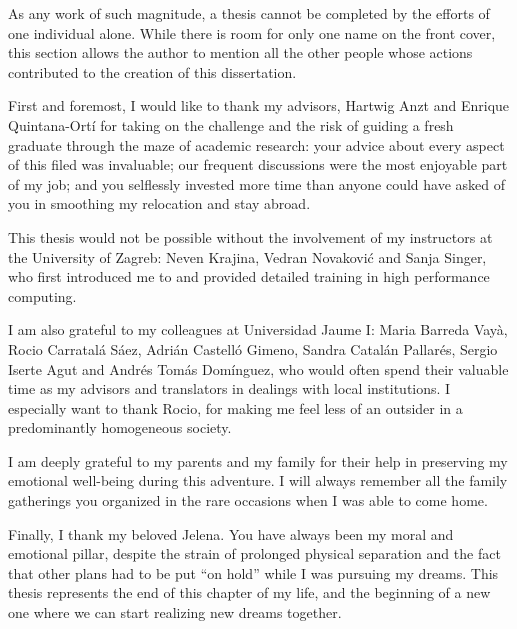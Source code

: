 As any work of such magnitude, a thesis cannot be completed by the efforts of
one individual alone. While there is room for only one name on the front cover,
this section allows the author to mention all the other people whose actions
contributed to the creation of this dissertation.

First and foremost, I would like to thank my advisors, Hartwig Anzt and Enrique
Quintana-Ort\'{i} for taking on the challenge and the risk of guiding a fresh
graduate through the maze of academic research: your advice about every aspect
of this filed was invaluable; our frequent discussions were the most enjoyable
part of my job; and you selflessly invested more time than anyone could have
asked of you in smoothing my relocation and stay abroad.

This thesis would not be possible without the involvement of my instructors at
the University of Zagreb: Neven Krajina, Vedran Novakovi\'{c} and Sanja Singer,
who first introduced me to and provided detailed training in high performance
computing.

I am also grateful to my colleagues at Universidad Jaume I: Maria Barreda
Vay\`{a}, Rocio Carratal\'{a} S\'{a}ez, Adri\'{a}n Castell\'{o} Gimeno, Sandra
Catal\'{a}n Pallar\'{e}s, Sergio Iserte Agut and Andr\'{e}s Tom\'{a}s
Dom\'{i}nguez, who would often spend their valuable time as my advisors and
translators in dealings with local institutions. I especially want to thank
Rocio, for making me feel less of an outsider in a predominantly homogeneous
society.

I am deeply grateful to my parents and my family for their help in preserving my
emotional well-being during this adventure. I will always remember all the
family gatherings you organized in the rare occasions when I was able to come
home.

Finally, I thank my beloved Jelena. You have always been my moral and emotional
pillar, despite the strain of prolonged physical separation and the fact that
other plans had to be put ``on hold'' while I was pursuing my dreams. This
thesis represents the end of this chapter of my life, and the beginning of a new
one where we can start realizing new dreams together.

